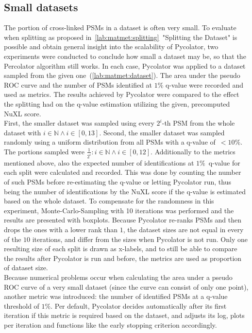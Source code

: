 \subsection{Small datasets}
\label{lab:matmet:small_datasets}
The portion of cross-linked PSMs in a dataset is often very small. To evaluate when splitting as proposed in~\ref{lab:matmet:splitting}~"Splitting the Dataset" is possible and obtain general insight into the scalability of Pycolator, two experiments were conducted to conclude how small a dataset may be, so that the Percolator algorithm still works. In each case, Pycolator was applied to a dataset sampled from the given one~(\ref{lab:matmet:dataset}). The area under the pseudo ROC curve and the number of PSMs identified at $1\%$ q-value were recorded and used as metrics. The results achieved by Pycolator were compared to the effect the splitting had on the q-value estimation utilizing the given, precomputed NuXL score.\\
First, the smaller dataset was sampled using every $2^i$-th PSM from the whole dataset with $i\in\mathbb{N} \land i\in[0,13]$. Second, the smaller dataset was sampled randomly using a uniform distribution from all PSMs with a q-value of~$<10\%$. The portions sampled were $\frac{1}{2^i} : i\in\mathbb{N} \land i\in[0,12]$. Additionally to the metrics mentioned above, also the expected number of identifications at $1\%$~q-value for each split were calculated and recorded. This was done by counting the number of such PSMs before re-estimating the q-value or letting Pycolator run, thus being the number of identifications by the NuXL score if the q-value is estimated based on the whole dataset.
To compensate for the randomness in this experiment, Monte-Carlo-Sampling with 10 iterations was performed and the results are presented with boxplots. Because Pycolator re-ranks PSMs and then drops the ones with a lower rank than $1$, the dataset sizes are not equal in every of the $10$ iterations, and differ from the sizes when Pycolator is not run. Only one resulting size of each split is drawn as x-labels, and to still be able to compare the results after Pycolator is run and before, the metrics are used as proportion of dataset size.\\
Because numerical problems occur when calculating the area under a pseudo ROC curve of a very small dataset (since the curve can consist of only one point), another metric was introduced: the number of identified PSMs at a q-value threshold of $1\%$. Per default, Pycolator decides automatically after its first iteration if this metric is required based on the dataset, and adjusts its log, plots per iteration and functions like the early stopping criterion accordingly.\\\\
